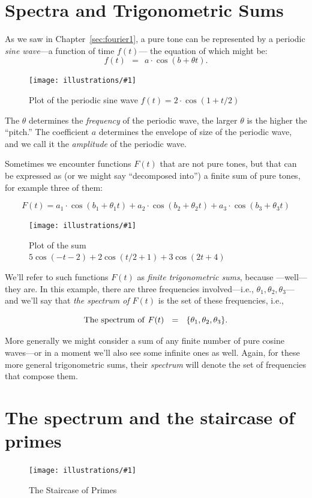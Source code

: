 \documentclass[openany]{book}
\newcommand{\ill}[3]{%
   \begin{figure}[H]%
   \vspace{-2ex}
   \centering%
   \texttt{[image: illustrations/\#1]}%
   \caption{#3}%
   \vspace{-2ex}
    \end{figure}}
\theoremstyle{plain}
\theoremstyle{definition}
\begin{document}
 \chapter{Spectra and Trigonometric Sums \label{sec:trigsums}}

As we saw in Chapter~\ref{sec:fourier1}, a pure tone can be represented by a periodic {\it sine wave}---a function of  time $f(t)$--- the equation of which might be:
$$f(t)\ \ = \ \ a\cdot \cos(b +\theta t).$$

\ill{pure_tone}{.7}{Plot of the periodic sine wave $f(t) = 2\cdot \cos(1+t/2)$}

The $\theta$ determines the {\it frequency} of the periodic wave, the
larger $\theta$ is the higher the ``pitch.''  The coefficient $a$
determines the envelope of size of the periodic wave, and we call it
the {\it amplitude} of the periodic wave.

Sometimes we encounter functions $F(t)$ that are not pure tones, but
that can be expressed as (or we might say ``decomposed into'') a finite
sum of pure tones, for example three of them:

$$F(t)  = a_1\cdot \cos(b_1 +\theta_1 t) + a_2\cdot \cos(b_2 +\theta_2 t) + a_3\cdot \cos(b_3 +\theta_3 t)$$

\ill{mixed_tone3}{.7}{Plot of the sum $5  \cos\left(-t - 2\right) + 2 \cos\left(t/2 + 1\right) + 3  \cos\left(2  t + 4\right)$}

We'll refer to such functions $F(t)$ as {\it finite trigonometric
  sums}, because ---well---they are.  In this example, there are three
frequencies involved---i.e., $\theta_1,\theta_2,\theta_3$---and we'll
say that {\it the spectrum of $F(t)$} is the set of these frequencies,
i.e.,

$$
  {\rm The\ spectrum \ of \ } F(t) \ \ = \ \ \{\theta_1,\theta_2,\theta_3\}.
$$

More generally we might consider a sum of any finite number of pure
cosine waves---or in a moment we'll also see some infinite ones as
well. Again, for these more general trigonometric sums, their {\it
  spectrum} will denote the set of frequencies that compose them.

\chapter{The spectrum and the staircase of primes\label{sec:fourier_staircase}}

\ill{prime_pi_100_aspect1}{0.95}{The Staircase of Primes\label{fig:staircase100}}
\end{document}
